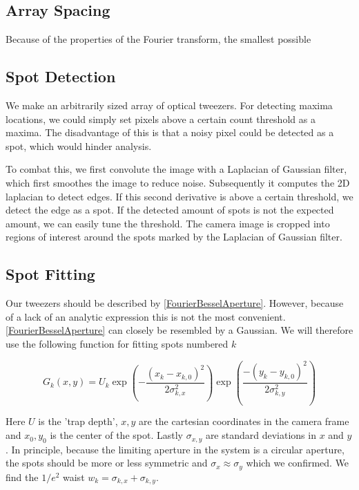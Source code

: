 \subsection{Array Spacing}

Because of the properties of the Fourier transform, the smallest possible 

\subsection{Spot Detection}

We make an arbitrarily sized array of optical tweezers. For detecting maxima locations, we could simply set pixels above a certain count threshold as a maxima. The disadvantage of this is that a noisy pixel could be detected as a spot, which would hinder analysis. 

To combat this, we first convolute the image with a Laplacian of Gaussian filter, which first smoothes the image to reduce noise. Subsequently it computes the 2D laplacian to detect edges. If this second derivative is above a certain threshold, we detect the edge as a spot. If the detected amount of spots is not the expected amount, we can easily tune the threshold. The camera image is cropped into regions of interest around the spots marked by the Laplacian of Gaussian filter. 

\subsection{Spot Fitting}

Our tweezers should be described by \cref{FourierBesselAperture}. However, because of a lack of an analytic expression this is not the most convenient. \cref{FourierBesselAperture} can closely be resembled by a Gaussian. We will therefore use the following function for fitting spots numbered $k$

\begin{equation}\label{2DGaussian}
    G_k(x,y) = U_k \exp{\left(-\frac{(x_k-x_{k,0})^2}{2\sigma_{k,x}^2}\right)}
    \exp{\left( \frac{-(y_k-y_{k,0})^2}{2\sigma_{k,y}^2} \right)}
\end{equation}

Here $U$ is the 'trap depth', $x,y$ are the cartesian coordinates in the camera frame and $x_0,y_0$ is the center of the spot. Lastly $\sigma_{x,y}$ are standard deviations in $x$ and $y$. In principle, because the limiting aperture in the system is a circular aperture, the spots should be more or less symmetric and $\sigma_x\approx \sigma_y$ which we confirmed. We find the $1/e^2$ waist $w_k=\sigma_{k,x}+\sigma_{k,y}$. 